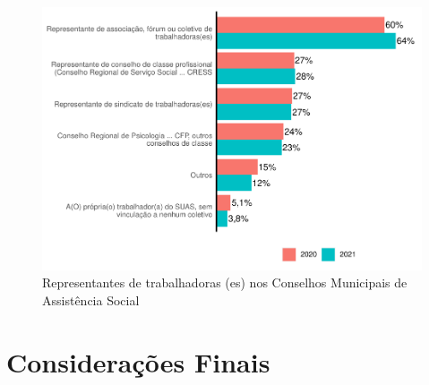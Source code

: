 \documentclass[
  brazilian]{report}
\begin{document}
\begin{figure}
\includegraphics{Censo-SUAS-2022_files/figure-latex/trab_cmun-1} \caption[Representantes de trabalhadoras (es) nos Conselhos Municipais de Assistência Social]{Representantes de trabalhadoras (es) nos Conselhos Municipais de Assistência Social}\label{fig:trab_cmun}
\end{figure}

\hypertarget{considerauxe7uxf5es-finais-4}{%
\chapter{Considerações Finais}\label{considerauxe7uxf5es-finais-4}}
\end{document}
